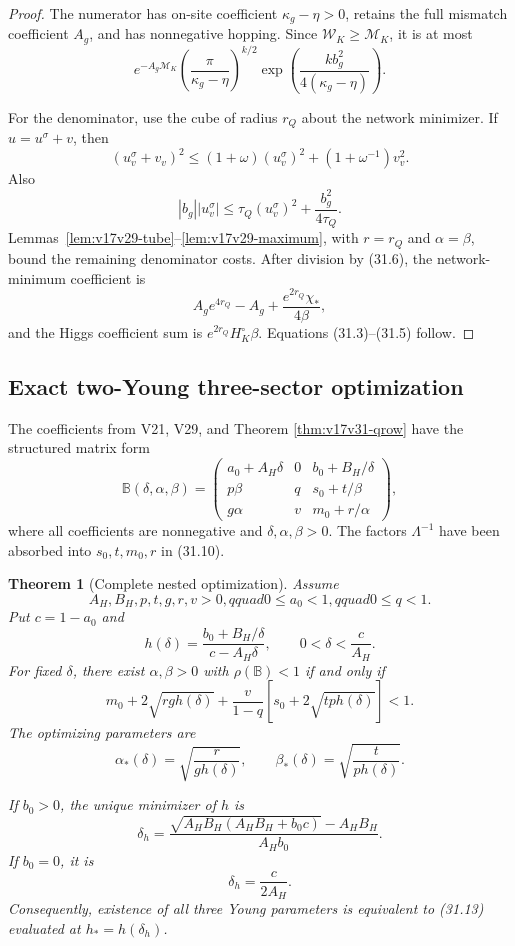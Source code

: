 \documentclass[11pt]{article}
\newtheorem{theorem}{Theorem}[section]
\theoremstyle{remark}
\begin{document}
\begin{proof}
The numerator has on-site coefficient \(\kappa_g-\eta>0\), retains the
full mismatch coefficient \(A_g\), and has nonnegative hopping.  Since
\(\mathcal W_K\geq\mathcal M_K\), it is at most
\[
 e^{-A_g\mathcal M_K}
 \left(\frac{\pi}{\kappa_g-\eta}\right)^{k/2}
 \exp\left(\frac{kb_g^2}{4(\kappa_g-\eta)}\right).               \tag{31.6}
\]

For the denominator, use the cube of radius \(r_Q\) about the network
minimizer.  If \(u=u^\sigma+v\), then
\[
 (u_v^\sigma+v_v)^2
 \leq(1+\omega)(u_v^\sigma)^2
 +(1+\omega^{-1})v_v^2.                            \tag{31.7}
\]
Also
\[
 |b_g||u_v^\sigma|
 \leq\tau_Q(u_v^\sigma)^2+\frac{b_g^2}{4\tau_Q}.  \tag{31.8}
\]
Lemmas~\ref{lem:v17v29-tube}--\ref{lem:v17v29-maximum}, with
\(r=r_Q\) and \(\alpha=\beta\), bound the remaining denominator
costs.  After division by (31.6), the network-minimum coefficient is
\[
 A_ge^{4r_Q}-A_g+\frac{e^{2r_Q}\chi_*}{4\beta},    \tag{31.9}
\]
and the Higgs coefficient sum is
\(e^{2r_Q}H_K^\circ\beta\).  Equations
(31.3)--(31.5) follow.
\end{proof}

\subsection{Exact two-Young three-sector optimization}

The coefficients from V21, V29, and Theorem
\ref{thm:v17v31-qrow} have the structured matrix form
\[
 \mathbb B(\delta,\alpha,\beta)
 =\begin{pmatrix}
 a_0+A_H\delta&0&b_0+B_H/\delta\\
 p\beta&q&s_0+t/\beta\\
 g\alpha&v&m_0+r/\alpha
 \end{pmatrix},                                   \tag{31.10}
\]
where all coefficients are nonnegative and
\(\delta,\alpha,\beta>0\).  The factors \(\Lambda^{-1}\) have been
absorbed into \(s_0,t,m_0,r\) in (31.10).

\begin{theorem}[Complete nested optimization]
\label{thm:v17v31-nested}
Assume
\[
 A_H,B_H,p,t,g,r,v>0,qquad
 0\leq a_0<1,qquad0\leq q<1.                     \tag{31.11}
\]
Put \(c=1-a_0\) and
\[
 h(\delta)=
 \frac{b_0+B_H/\delta}{c-A_H\delta},
 \qquad0<\delta<\frac c{A_H}.                     \tag{31.12}
\]
For fixed \(\delta\), there exist \(\alpha,\beta>0\) with
\(\rho(\mathbb B)<1\) if and only if
\[
 \boxed{
 m_0+2\sqrt{rgh(\delta)}
 +\frac{v}{1-q}
 \left[s_0+2\sqrt{tph(\delta)}\right]<1.}         \tag{31.13}
\]
The optimizing parameters are
\[
 \boxed{
 \alpha_*(\delta)=\sqrt{\frac{r}{g h(\delta)}},
 \qquad
 \beta_*(\delta)=\sqrt{\frac{t}{p h(\delta)}}.}  \tag{31.14}
\]

If \(b_0>0\), the unique minimizer of \(h\) is
\[
 \boxed{
 \delta_h=
 \frac{\sqrt{A_HB_H(A_HB_H+b_0c)}-A_HB_H}
 {A_Hb_0}.}                                       \tag{31.15}
\]
If \(b_0=0\), it is
\[
 \boxed{\delta_h=\frac{c}{2A_H}.}                 \tag{31.16}
\]
Consequently, existence of all three Young parameters is equivalent to
(31.13) evaluated at \(h_*=h(\delta_h)\).
\end{theorem}
\end{document}
